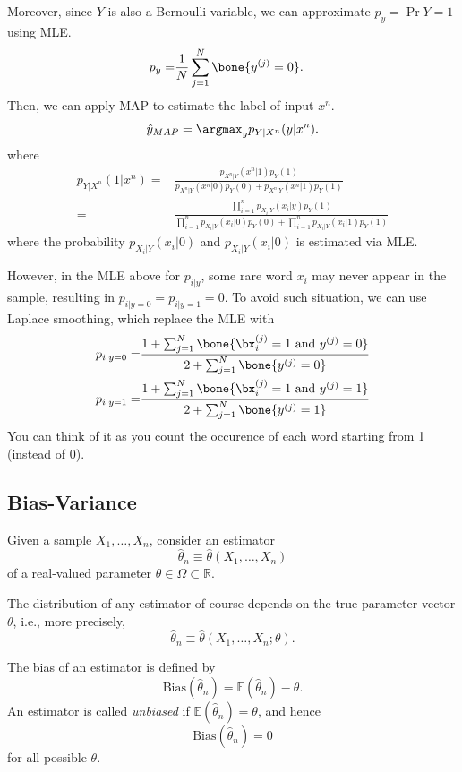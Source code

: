 \documentclass{article}
\begin{document}
Moreover, since $Y$ is also a Bernoulli variable, we can approximate $p_y = \Pr{Y=1}$ using MLE.
\begin{align}
    p_{y} =& \frac{1}{N}\sum_{j=1}^N \bone\{y^{(j)}=0\}.
\end{align}
Then, we can apply MAP to estimate the label of input $x^n$.
\begin{align}
    \hat{y}_{MAP} = \argmax_{y} p_{Y|X^n}(y|x^n).
\end{align}
where
\begin{align}
     p_{Y|X^n}(1|x^n) =& \frac{p_{X^n|Y}(x^n|1)p_Y(1)}{p_{X^n|Y}(x^n|0)p_Y(0) + p_{X^n|Y}(x^n|1)p_Y(1) }\\
     =& \frac{\prod_{i=1}^np_{X_i|Y}(x_i|y) p_Y(1)}{\prod_{i=1}^np_{X_i|Y}(x_i|0)p_Y(0) + \prod_{i=1}^np_{X_i|Y}(x_i|1)p_Y(1) }
\end{align}
where the probability $p_{X_i|Y}(x_i|0)$ and $p_{X_i|Y}(x_i|0)$ is estimated via MLE.


However, in the MLE above for $p_{i|y}$, some rare word $x_i$ may never appear in the sample,
resulting in $p_{i|y=0}=p_{i|y=1}=0$.
To avoid such situation, we can use Laplace smoothing, which replace the MLE with 
\begin{align}
    p_{i|y=0} =& \frac{1+\sum_{j=1}^N \bone\{\bx^{(j)}_i=1 \mbox{ and }y^{(j)}=0\}}{2+\sum_{j=1}^N \bone\{y^{(j)}=0\}}\\
    p_{i|y=1} =& \frac{1+\sum_{j=1}^N \bone\{\bx^{(j)}_i=1 \mbox{ and }y^{(j)}=1\}}{2+\sum_{j=1}^N \bone\{y^{(j)}=1\}}
\end{align}
You can think of it as you count the occurence of each word starting from 1 (instead of 0).



\subsection{Bias-Variance}
Given a sample \( X_1, \dots, X_n \), consider an estimator 
\[
\hat{\theta}_n \equiv \hat{\theta}(X_1, \dots, X_n)
\]
of a real-valued parameter \( \theta \in \Omega \subset \mathbb{R} \).

The distribution of any estimator of course depends on the true parameter vector \( \theta \), i.e., more precisely,
\[
\hat{\theta}_n \equiv \hat{\theta}(X_1, \dots, X_n; \theta).
\]

The bias of an estimator is defined by
\[
\text{Bias}(\hat{\theta}_n) = \mathbb{E}(\hat{\theta}_n) - \theta.
\]
An estimator is called \emph{unbiased} if \( \mathbb{E}(\hat{\theta}_n) = \theta \), and hence 
\[
\text{Bias}(\hat{\theta}_n) = 0
\]
for all possible \( \theta \).
\end{document}
